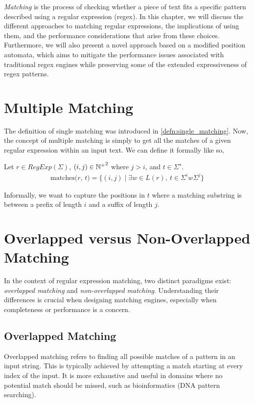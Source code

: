 \emph{Matching} is the process of checking whether a piece of text fits a specific pattern described using a regular expression (regex).
In this chapter, we will discuss the different approaches to matching regular expressions, the implications of using them, and the performance considerations that arise from these choices. Furthermore, we will also present a novel approach based on a modified position automata, which aims to mitigate the performance issues associated with traditional regex engines while preserving some of the extended expressiveness of regex patterns.

\section{Multiple Matching}
\label{sec:multimatching}
The definition of single matching was introduced in \ref{defn:single_matching}. Now, the concept of multiple matching is simply to get all the matches of a given regular expression within an input text.
We can define it formally like so,
\begin{defn}
	Let $r \in RegExp(\Sigma)$, $(i,j) \in {\mathbb{N}^{+}}^2$ where $j>i$, and $t \in \Sigma^\star$.
	\begin{align*}
		\text{matches($r$, $t$)} = \{
			(i,j) \mid \exists w \in L(r), \ t \in \Sigma^i w \Sigma^j
		\}
	\end{align*}
\end{defn}
Informally, we want to capture the positions in $t$ where a matching substring is between a prefix of length $i$ and a suffix of length $j$.

\section{Overlapped versus Non-Overlapped Matching}
\label{sec:overlap-vs-nonoverlap}

In the context of regular expression matching, two distinct paradigms exist: \emph{overlapped matching} and \emph{non-overlapped matching}. Understanding their differences is crucial when designing matching engines, especially when completeness or performance is a concern.

\subsection*{Overlapped Matching}
Overlapped matching refers to finding all possible matches of a pattern in an input string. This is typically achieved by attempting a match starting at every index of the input. It is more exhaustive and useful in domains where no potential match should be missed, such as bioinformatics (DNA pattern searching).

